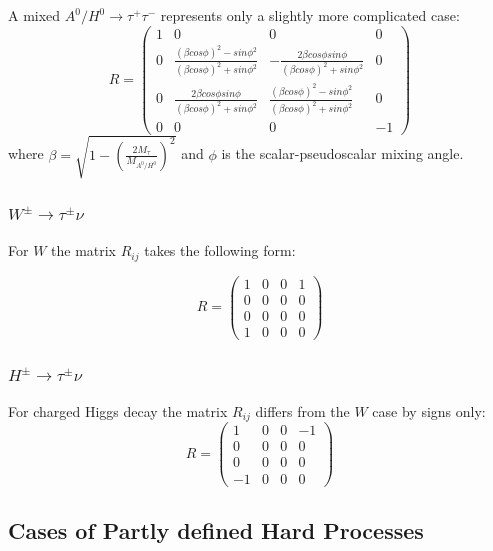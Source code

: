 \documentclass[]{Tauola_interface_design}
\begin{document}
A mixed $A^0/H^0 \rightarrow \tau^+ \tau^-$   represents only a slightly more complicated case:
\[R=\begin{pmatrix} 
1 & 0 & 0 & 0 \\
0 & \frac{(\beta cos\phi)^2 - sin\phi^2 }{(\beta cos\phi)^2+sin\phi^2} & -\frac{2\beta cos\phi sin\phi}{(\beta cos\phi)^2+sin\phi^2} & 0 \\
0 & \frac{2\beta cos\phi sin\phi}{(\beta cos\phi)^2+sin\phi^2} & \frac{(\beta cos\phi)^2 - sin\phi^2 }{(\beta cos\phi)^2+sin\phi^2} & 0 \\
0 & 0 & 0 & -1 
\end{pmatrix}\]
where $\beta = \sqrt{1-(\frac{2M_{\tau}}{M_{A^0/H^0}})^2}$
and $\phi$ is the scalar-pseudoscalar mixing angle.


\subsubsection{$W^{\pm} \rightarrow \tau^{\pm} \nu$}
\label{subsubsection:W}

 For $W$ the matrix $R_{ij}$ takes the following form:

\[R=\begin{pmatrix} 
1 & 0 & 0 & 1 \\
0 & 0 & 0 & 0 \\
0 & 0 & 0 & 0 \\
1 & 0 & 0 & 0 
\end{pmatrix}\]


\subsubsection{$H^{\pm} \rightarrow \tau^{\pm} \nu$}
For charged Higgs decay the matrix $R_{ij}$ differs from the $W$ case by signs only:
\[R=\begin{pmatrix} 
1 & 0 & 0 & -1 \\
0 & 0 & 0 & 0 \\
0 & 0 & 0 & 0 \\
-1 & 0 & 0 & 0 
\end{pmatrix}\]

\subsection{Cases of Partly defined Hard Processes}
\label{sect:Partlydefined}
 
\end{document}
